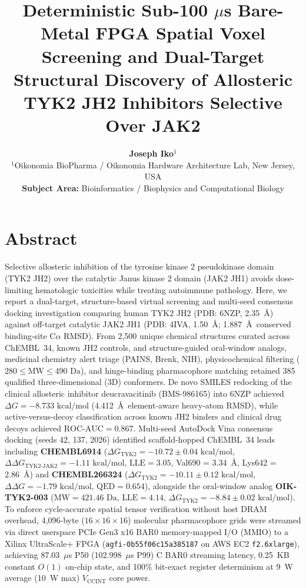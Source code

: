 \documentclass[10pt,letterpaper]{article}
\title{\textbf{Deterministic Sub-100 $\mu$s Bare-Metal FPGA Spatial Voxel Screening and Dual-Target Structural Discovery of Allosteric TYK2 JH2 Inhibitors Selective Over JAK2}}
\author{\textbf{Joseph Iko}$^{1}$ \\
\small $^{1}$Oikonomia BioPharma / Oikonomia Hardware Architecture Lab, New Jersey, USA \\
\small \textbf{Subject Area:} Bioinformatics / Biophysics and Computational Biology}
\date{}
\begin{document}
\maketitle
\vspace{-1.5em}

\section*{Abstract}
Selective allosteric inhibition of the tyrosine kinase 2 pseudokinase domain (TYK2 JH2) over the catalytic Janus kinase 2 domain (JAK2 JH1) avoids dose-limiting hematologic toxicities while treating autoimmune pathology. Here, we report a dual-target, structure-based virtual screening and multi-seed consensus docking investigation comparing human TYK2 JH2 (PDB: 6NZP, 2.35~Å) against off-target catalytic JAK2 JH1 (PDB: 4IVA, 1.50~Å; 1.887~Å\ conserved binding-site C$\alpha$ RMSD). From 2,500 unique chemical structures curated across ChEMBL~34, known JH2 controls, and structure-guided oral-window analogs, medicinal chemistry alert triage (PAINS, Brenk, NIH), physicochemical filtering ($280 \le \text{MW} \le 490\text{ Da}$), and hinge-binding pharmacophore matching retained 385 qualified three-dimensional (3D) conformers. De novo SMILES redocking of the clinical allosteric inhibitor deucravacitinib (BMS-986165) into 6NZP achieved $\Delta G = -8.733\text{ kcal/mol}$ (4.412~Å\ element-aware heavy-atom RMSD), while active-versus-decoy classification across known JH2 binders and clinical drug decoys achieved $\text{ROC-AUC} = 0.867$. Multi-seed AutoDock Vina consensus docking (seeds 42, 137, 2026) identified scaffold-hopped ChEMBL~34 leads including \textbf{CHEMBL6914} ($\Delta G_{\text{TYK2}} = -10.72 \pm 0.04\text{ kcal/mol}$, $\Delta\Delta G_{\text{TYK2-JAK2}} = -1.11\text{ kcal/mol}$, $\text{LLE} = 3.05$, Val690 = 3.34~Å, Lys642 = 2.86~Å) and \textbf{CHEMBL266324} ($\Delta G_{\text{TYK2}} = -10.11 \pm 0.12\text{ kcal/mol}$, $\Delta\Delta G = -1.79\text{ kcal/mol}$, $\text{QED} = 0.654$), alongside the oral-window analog \textbf{OIK-TYK2-003} ($\text{MW} = 421.46\text{ Da}$, $\text{LLE} = 4.14$, $\Delta G_{\text{TYK2}} = -8.84 \pm 0.02\text{ kcal/mol}$). To enforce cycle-accurate spatial tensor verification without host DRAM overhead, 4,096-byte ($16\times16\times16$) molecular pharmacophore grids were streamed via direct userspace PCIe Gen3 x16 BAR0 memory-mapped I/O (MMIO) to a Xilinx UltraScale+ FPGA (\texttt{agfi-0b55f06c15a385187} on AWS EC2 \texttt{f2.6xlarge}), achieving 87.03~$\mu$s P50 (102.998~$\mu$s P99) C BAR0 streaming latency, 0.25~KB constant $O(1)$ on-chip state, and 100\% bit-exact register determinism at 9~W average (10~W max) $V_{\text{CCINT}}$ core power.
\end{document}
